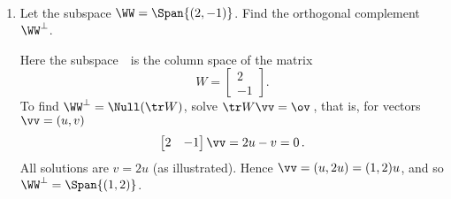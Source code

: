 \begin{example} \label{eg:nulltrw}
\ 
\begin{enumerate}
\item\label{eg:nulltrw:a} Let the subspace \(\WW=\Span\{(2,-1)\}\). Find the orthogonal complement~\(\WW^\perp\). 
\begin{solution} 
Here the subspace~\WW\ is the column space of the matrix
%
\begin{equation*}
W=\begin{bmatrix} 2\\-1 \end{bmatrix}.
\end{equation*}
To find \(\WW^\perp=\Null(\tr W)\), solve \(\tr W\vv=\ov\)\,, that is, for vectors \(\vv=(u,v)\)
\begin{equation*}
\begin{bmatrix} 2&-1 \end{bmatrix}\vv=2u-v=0\,.
\end{equation*}
All solutions are \(v=2u\) (as illustrated).
Hence \(\vv=(u,2u)=(1,2)u\), and so \(\WW^\perp=\Span\{(1,2)\}\).
\end{solution}


\end{enumerate}
\end{example}

